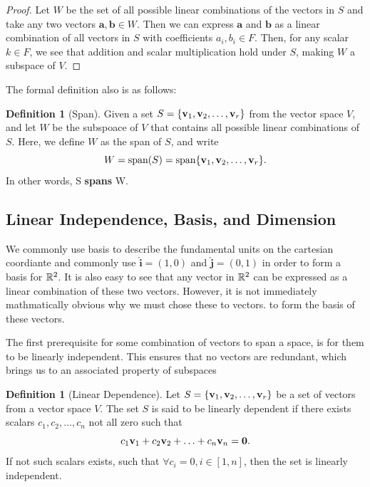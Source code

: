 \documentclass[12pt]{article}
\theoremstyle{definition}
\newtheorem{definition}[theorem]{Definition}
\begin{document}
\begin{proof}
    Let $W$ be the set of all possible linear combinations of the vectors in $S$ and take any two vectors $\mathbf{a}, \mathbf{b} \in W$. Then we can express $\mathbf{a}$ and $\mathbf{b}$ as a linear combination of all vectors in $S$ with coefficients $a_i, b_i \in F$. Then, for any scalar $k \in F$, we see that addition and scalar multiplication hold under $S$, making $W$ a subspace of $V$.
\end{proof}

The formal definition also is as follows:

\begin{definition}[Span]
    Given a set $S = \{\mathbf{v}_1, \mathbf{v}_2, \ldots, \mathbf{v}_r\}$ from the vector space $V$, and let $W$ be the subspoace of $V$ that contains all possible linear combinations of $S$. Here, we define $W$ as the span of $S$, and write $$W = \text{span}(S) = \text{span}\{\mathbf{v}_1, \mathbf{v}_2, \ldots, \mathbf{v}_r\}.$$ In other words, S \textbf{spans} W. 
\end{definition}



\subsection{Linear Independence, Basis, and Dimension}

We commonly use basis to describe the fundamental units on the cartesian coordiante and commonly use $\mathbf{\hat{i}} = (1, 0)$ and $\mathbf{\hat{j}} = (0, 1)$ in order to form a basis for $\mathbb{R}^2$. It is also easy to see that any vector in $\mathbb{R}^2$ can be expressed as a linear combination of these two vectors. However, it is not immediately mathmatically obvious why we must chose these to vectors.  to form the basis of these vectors. 

The first prerequisite for some combination of vectors to span a space, is for them to be linearly independent. This ensures that no vectors are redundant, which brings us to an associated property of subspaces

\begin{definition}[Linear Dependence]
    Let $S = \{\mathbf{v}_1, \mathbf{v}_2, \ldots, \mathbf{v}_r\}$ be a set of vectors from a vector space $V$. The set $S$ is said to be linearly dependent if there exists scalars $c_1, c_2, \ldots, c_n$ not all zero such that $$c_1 \mathbf{v}_1 + c_2 \mathbf{v}_2 + \ldots + c_n \mathbf{v}_n = \mathbf{0}.$$ If not such scalars exists, such that $\forall c_i = 0, i \in [1, n]$, then the set is linearly independent. 
\end{definition}
\end{document}
